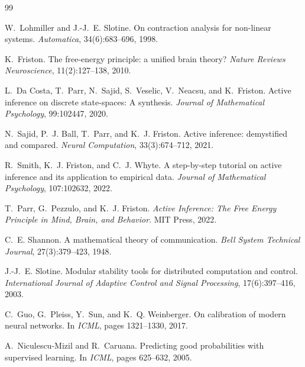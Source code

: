 \documentclass[11pt,twocolumn]{article}
\begin{document}
\begin{thebibliography}{99}

W.~Lohmiller and J.-J.~E. Slotine.
\newblock On contraction analysis for non-linear systems.
\newblock \emph{Automatica}, 34(6):683--696, 1998.

K.~Friston.
\newblock The free-energy principle: a unified brain theory?
\newblock \emph{Nature Reviews Neuroscience}, 11(2):127--138, 2010.

L.~Da Costa, T.~Parr, N.~Sajid, S.~Veselic, V.~Neacsu, and K.~Friston.
\newblock Active inference on discrete state-spaces: A synthesis.
\newblock \emph{Journal of Mathematical Psychology}, 99:102447, 2020.

N.~Sajid, P.~J. Ball, T.~Parr, and K.~J. Friston.
\newblock Active inference: demystified and compared.
\newblock \emph{Neural Computation}, 33(3):674--712, 2021.

R.~Smith, K.~J. Friston, and C.~J. Whyte.
\newblock A step-by-step tutorial on active inference and its application to empirical data.
\newblock \emph{Journal of Mathematical Psychology}, 107:102632, 2022.

T.~Parr, G.~Pezzulo, and K.~J. Friston.
\newblock \emph{Active Inference: The Free Energy Principle in Mind, Brain, and Behavior}.
\newblock MIT Press, 2022.

C.~E. Shannon.
\newblock A mathematical theory of communication.
\newblock \emph{Bell System Technical Journal}, 27(3):379--423, 1948.

J.-J.~E. Slotine.
\newblock Modular stability tools for distributed computation and control.
\newblock \emph{International Journal of Adaptive Control and Signal Processing},
  17(6):397--416, 2003.

C.~Guo, G.~Pleiss, Y.~Sun, and K.~Q. Weinberger.
\newblock On calibration of modern neural networks.
\newblock In \emph{ICML}, pages 1321--1330, 2017.

A.~Niculescu-Mizil and R.~Caruana.
\newblock Predicting good probabilities with supervised learning.
\newblock In \emph{ICML}, pages 625--632, 2005.


\end{thebibliography}
\end{document}
